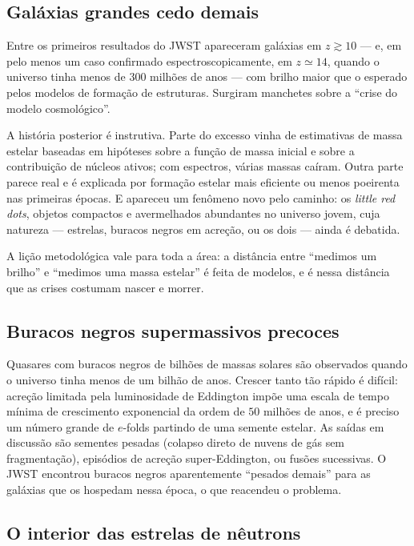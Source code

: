\documentclass[11pt,a4paper]{article}
\begin{document}
\subsection*{Galáxias grandes cedo demais}

Entre os primeiros resultados do JWST apareceram galáxias em $z\gtrsim10$ --- e, em pelo menos um caso confirmado espectroscopicamente, em $z\simeq14$, quando o universo tinha menos de $300$ milhões de anos --- com brilho maior que o esperado pelos modelos de formação de estruturas. Surgiram manchetes sobre a ``crise do modelo cosmológico''.

A história posterior é instrutiva. Parte do excesso vinha de estimativas de massa estelar baseadas em hipóteses sobre a função de massa inicial e sobre a contribuição de núcleos ativos; com espectros, várias massas caíram. Outra parte parece real e é explicada por formação estelar mais eficiente ou menos poeirenta nas primeiras épocas. E apareceu um fenômeno novo pelo caminho: os \textit{little red dots}, objetos compactos e avermelhados abundantes no universo jovem, cuja natureza --- estrelas, buracos negros em acreção, ou os dois --- ainda é debatida.

A lição metodológica vale para toda a área: a distância entre ``medimos um brilho'' e ``medimos uma massa estelar'' é feita de modelos, e é nessa distância que as crises costumam nascer e morrer.

\subsection*{Buracos negros supermassivos precoces}

Quasares com buracos negros de bilhões de massas solares são observados quando o universo tinha menos de um bilhão de anos. Crescer tanto tão rápido é difícil: acreção limitada pela luminosidade de Eddington impõe uma escala de tempo mínima de crescimento exponencial da ordem de $50$ milhões de anos, e é preciso um número grande de $e$-folds partindo de uma semente estelar. As saídas em discussão são sementes pesadas (colapso direto de nuvens de gás sem fragmentação), episódios de acreção super-Eddington, ou fusões sucessivas. O JWST encontrou buracos negros aparentemente ``pesados demais'' para as galáxias que os hospedam nessa época, o que reacendeu o problema.

\subsection*{O interior das estrelas de nêutrons}
\end{document}

